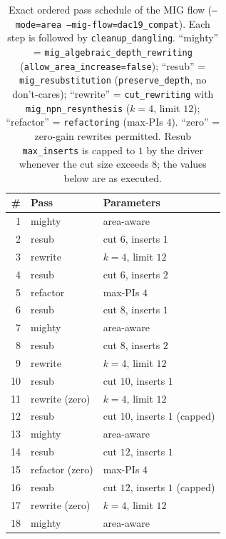 \begin{table}[t]
\centering
\caption{Exact ordered pass schedule of the MIG flow
(\texttt{--mode=area --mig-flow=dac19\_compat}). Each step is followed by
\texttt{cleanup\_dangling}. ``mighty'' = \texttt{mig\_algebraic\_depth\_rewriting}
(\texttt{allow\_area\_increase=false}); ``resub'' = \texttt{mig\_resubstitution}
(\texttt{preserve\_depth}, no don't-cares); ``rewrite'' =
\texttt{cut\_rewriting} with \texttt{mig\_npn\_resynthesis} ($k{=}4$, limit $12$);
``refactor'' = \texttt{refactoring} (max-PIs $4$). ``zero'' = zero-gain rewrites
permitted. Resub \texttt{max\_inserts} is capped to $1$ by the driver whenever
the cut size exceeds $8$; the values below are as executed.}
\label{tab:mig-schedule}
\begin{tabular}{rll}
\toprule
\# & Pass & Parameters \\
\midrule
1  & mighty            & area-aware \\
2  & resub             & cut $6$, inserts $1$ \\
3  & rewrite           & $k{=}4$, limit $12$ \\
4  & resub             & cut $6$, inserts $2$ \\
5  & refactor          & max-PIs $4$ \\
6  & resub             & cut $8$, inserts $1$ \\
7  & mighty            & area-aware \\
8  & resub             & cut $8$, inserts $2$ \\
9  & rewrite           & $k{=}4$, limit $12$ \\
10 & resub             & cut $10$, inserts $1$ \\
11 & rewrite (zero)    & $k{=}4$, limit $12$ \\
12 & resub             & cut $10$, inserts $1$ (capped) \\
13 & mighty            & area-aware \\
14 & resub             & cut $12$, inserts $1$ \\
15 & refactor (zero)   & max-PIs $4$ \\
16 & resub             & cut $12$, inserts $1$ (capped) \\
17 & rewrite (zero)    & $k{=}4$, limit $12$ \\
18 & mighty            & area-aware \\
\bottomrule
\end{tabular}
\end{table}
